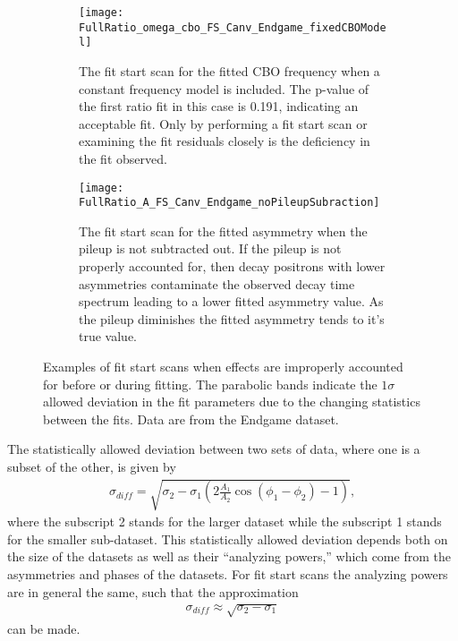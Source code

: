 \begin{figure}[h]
\centering
    \begin{subfigure}[t]{0.45\textwidth}
        \centering
        \texttt{[image: FullRatio\_omega\_cbo\_FS\_Canv\_Endgame\_fixedCBOModel]}
        \caption{The fit start scan for the fitted CBO frequency when a constant frequency model is included. The p-value of the first ratio fit in this case is 0.191, indicating an acceptable fit. Only by performing a fit start scan or examining the fit residuals closely is the deficiency in the fit observed.}
    \end{subfigure}%
    \hspace{4mm}
    \begin{subfigure}[t]{0.45\textwidth}
        \centering
        \texttt{[image: FullRatio\_A\_FS\_Canv\_Endgame\_noPileupSubraction]}
        \caption{The fit start scan for the fitted asymmetry when the pileup is not subtracted out. If the pileup is not properly accounted for, then decay positrons with lower asymmetries contaminate the observed decay time spectrum leading to a lower fitted asymmetry value. As the pileup diminishes the fitted asymmetry tends to it's true value.}
    \end{subfigure}
\caption[Examples of fit start scans when effects are improperly accounted for before or during fitting]{Examples of fit start scans when effects are improperly accounted for before or during fitting. The parabolic bands indicate the $1\sigma$ allowed deviation in the fit parameters due to the changing statistics between the fits. Data are from the Endgame dataset.}
\label{fig:badStartScans}
\end{figure}



The statistically allowed deviation between two sets of \gmtwo data, where one is a subset of the other, is given by~\cite{E821FinalReport}
  \begin{align} \label{eq:sigmaDiffFull}
    \sigma_{diff} = \sqrt{\sigma_{2} - \sigma_{1}(2 \frac{A_{1}}{A_{2}}\cos(\phi_{1}-\phi_{2}) - 1)},
  \end{align}
where the subscript 2 stands for the larger dataset while the subscript 1 stands for the smaller sub-dataset. This statistically allowed deviation depends both on the size of the datasets as well as their ``analyzing powers,'' which come from the asymmetries and phases of the datasets. For fit start scans the analyzing powers are in general the same, such that the approximation 
  \begin{align} \label{eq:sigmaDiffApprox}
    \sigma_{diff} \approx \sqrt{\sigma_{2} - \sigma_{1}}
  \end{align}
can be made. 


